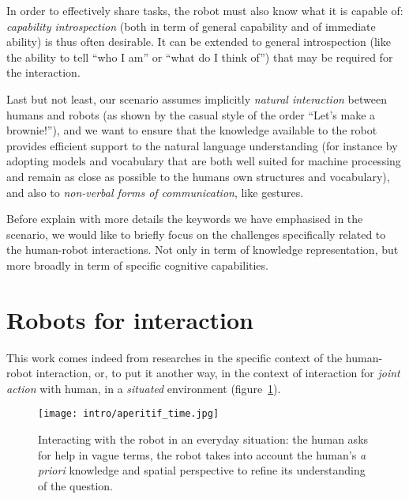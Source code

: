 In order to effectively share tasks, the robot must also know what it is
capable of: \emph{capability introspection} (both in term of general capability
and of immediate ability) is thus often desirable. It can be extended to
general introspection (like the ability to tell ``who I am'' or ``what do I
think of'') that may be required for the interaction.

Last but not least, our scenario assumes implicitly \emph{natural interaction}
between humans and robots (as shown by the casual style of the order ``Let's
make a brownie!''), and we want to ensure that the
knowledge available to the robot provides efficient support to the natural
language understanding (for instance by adopting models and vocabulary that are
both well suited for machine processing and remain as close as possible to the
humans own structures and vocabulary), and also to \emph{non-verbal forms of
communication}, like gestures.


Before explain with more details the keywords we have emphasised in the
scenario, we would like to briefly focus on the challenges specifically related
to the human-robot interactions. Not only in term of knowledge representation,
but more broadly in term of specific cognitive capabilities.


\section{Robots for interaction}
\label{sect|hri-context}

This work comes indeed from researches in the specific context of the
human-robot interaction, or, to put it another way, in the context of
interaction for \emph{joint action} with human,  in a \emph{situated}
environment (figure~\ref{fig|aperitif}).

\begin{figure}%
    \centering
    \texttt{[image: intro/aperitif\_time.jpg]} 

    \caption{Interacting with the robot in an everyday situation: the human
    asks for help in vague terms, the robot takes into account the human's {\it
    a priori} knowledge and spatial perspective to refine its understanding of
    the question.} 

    \label{fig|aperitif} 
\end{figure}

